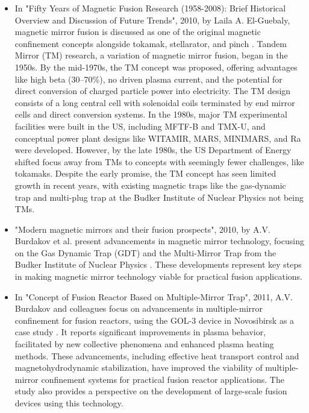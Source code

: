 \begin{itemize}
 \item In "Fifty Years of Magnetic Fusion Research (1958-2008): Brief Historical Overview and Discussion of Future Trends", 2010, by Laila A. El-Guebaly, magnetic mirror fusion is discussed as one of the original magnetic confinement concepts alongside tokamak, stellarator, and pinch \cite{el2010fifty}. Tandem Mirror (TM) research, a variation of magnetic mirror fusion, began in the 1950s. By the mid-1970s, the TM concept was proposed, offering advantages like high beta (30–70\%), no driven plasma current, and the potential for direct conversion of charged particle power into electricity. The TM design consists of a long central cell with solenoidal coils terminated by end mirror cells and direct conversion systems. In the 1980s, major TM experimental facilities were built in the US, including MFTF-B and TMX-U, and conceptual power plant designs like WITAMIR, MARS, MINIMARS, and Ra were developed. However, by the late 1980s, the US Department of Energy shifted focus away from TMs to concepts with seemingly fewer challenges, like tokamaks. Despite the early promise, the TM concept has seen limited growth in recent years, with existing magnetic traps like the gas-dynamic trap and multi-plug trap at the Budker Institute of Nuclear Physics not being TMs.

 \item "Modern magnetic mirrors and their fusion prospects", 2010, by A.V. Burdakov et al. present advancements in magnetic mirror technology, focusing on the Gas Dynamic Trap (GDT) and the Multi-Mirror Trap from the Budker Institute of Nuclear Physics \cite{burdakov2010modern}. These developments represent key steps in making magnetic mirror technology viable for practical fusion applications.

  

  \item In "Concept of Fusion Reactor Based on Multiple-Mirror Trap", 2011, A.V. Burdakov and colleagues focus on advancements in multiple-mirror confinement for fusion reactors, using the GOL-3 device in Novosibirsk as a case study \cite{burdakov2011concept}. It reports significant improvements in plasma behavior, facilitated by new collective phenomena and enhanced plasma heating methods. These advancements, including effective heat transport control and magnetohydrodynamic stabilization, have improved the viability of multiple-mirror confinement systems for practical fusion reactor applications. The study also provides a perspective on the development of large-scale fusion devices using this technology.


\end{itemize}
